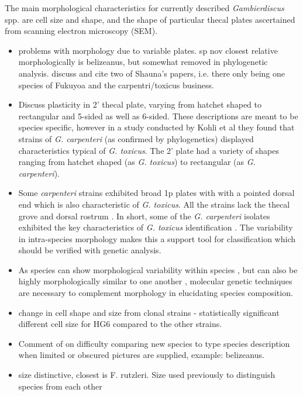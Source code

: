 \documentclass[12pt]{article}
\begin{document}
The main morphological characteristics for currently described \emph{Gambierdiscus} spp. are cell size and shape, and the shape of particular thecal plates ascertained from scanning electron microscopy (SEM).
\begin{itemize}
\item problems with morphology due to variable plates. sp nov closest relative morphologically is belizeanus, but somewhat removed in phylogenetic analysis. discuss and cite two of Shauna's papers, i.e. there only being one species of Fukuyoa and the carpentri/toxicus business. 

\item Discuss plasticity in 2' thecal plate, varying from hatchet shaped to rectangular and 5-sided as well as 6-sided.
These descriptions are meant to be species specific, however in a study conducted by Kohli et al they found that strains of \emph{G. carpenteri} (as confirmed by phylogenetics) displayed characteristics typical of \emph{G. toxicus}. The 2' plate had a variety of shapes ranging from hatchet shaped (as \emph{G. toxicus}) to rectangular (as \emph{G. carpenteri}). 

\item Some \emph{carpenteri} strains exhibited broad 1p plates with with a pointed dorsal end which is also characteristic of \emph{G. toxicus}. All the strains lack the thecal grove and  dorsal rostrum \cite{litaker2009taxonomy}. In short, some of the \emph{G. carpenteri} isolates exhibited the key characteristics of \emph{G. toxicus} identification \cite{kohli2014high}.
The variability in intra-species morphology makes this a support tool for classification which should be verified with genetic analysis.

\item  As species can show morphological variability within species \cite{bravo2014cellular}, but can also be highly morphologically similar to one another \cite{kohli2014high}, molecular genetic techniques are necessary to complement morphology in elucidating species composition.

\item change in cell shape and size from clonal strains \cite{bravo2014cellular} - statistically significant different cell size for HG6 compared to the other strains.


\item Comment of on difficulty comparing new species to type species description when limited or obscured pictures are supplied, example: belizeanus.

\item size distinctive, closest is F. rutzleri. Size used previously to distinguish species from each other
\end{itemize}
\end{document}

